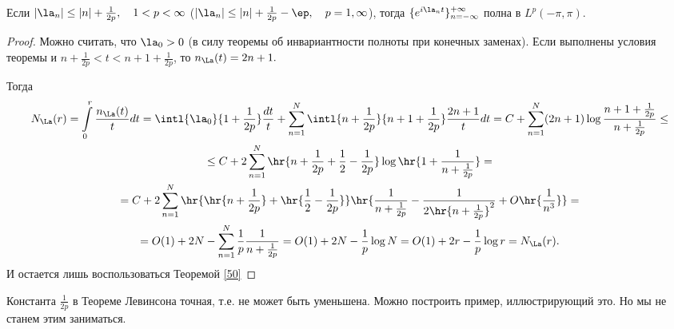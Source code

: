 \documentclass[a4paper]{article}
\begin{document}
\begin{imp}
Если $|\la_n|\le|n|+\frac1{2p},\quad1<p<\infty$
($|\la_n|\le|n|+\frac1{2p}-\ep,\quad p=1,\infty$),
тогда $\{e^{i\la_n t}\}_{n=-\infty}^{+\infty}$ полна в
$L^p(-\pi,\pi).$
\end{imp}
\begin{proof}
  Можно считать, что $\la_0>0$ (в силу
  теоремы об инвариантности полноты при конечных заменах). Если
  выполнены условия теоремы и $n+\frac1{2p}<t<n+1+\frac1{2p}$, то
  $n_{\La}(t)=2n+1.$

  Тогда
  \begin{multline*}
    N_{\La}(r)=\int\limits_0^r\frac{n_{\La}(t)}tdt=\intl{\la_0}{1+\frac1{2p}}\frac{dt}t+\sum\limits_{n=1}^N\intl{n+\frac1{2p}}{n+1+\frac1{2p}}\frac{2n+1}t
    dt=C+\sum\limits_{n=1}^N(2n+1)\log\frac{n+1+\frac1{2p}}{n+\frac1{2p}}\le\\
    \le
    C+2\sum\limits_{n=1}^N\hr{n+\frac1{2p}+\frac12-\frac1{2p}}\log\hr{1+\frac1{n+\frac1{2p}}}=\\
    =C+2\sum\limits_{n=1}^N\hr{\hr{n+\frac1{2p}}+\hr{\frac12-\frac1{2p}}}\hr{\frac1{n+\frac1{2p}}-\frac1{2\hr{n+\frac1{2p}}^2}+O\hr{\frac1{n^3}}}=\\
    =O(1)+2N-\sum\limits_{n=1}^N\frac1p\frac1{n+\frac1{2p}}=O(1)+2N-\frac1p\log
    N=O(1)+2r-\frac1p\log r=N_{\La}(r).
  \end{multline*}
  И остается лишь воспользоваться Теоремой \ref{50}
\end{proof}

\begin{note}
  Константа $\frac1{2p}$ в Теореме
  Левинсона точная, т.е. не может быть уменьшена. Можно построить
  пример, иллюстрирующий это. Но мы не станем этим заниматься.
\end{note}
\end{document}
